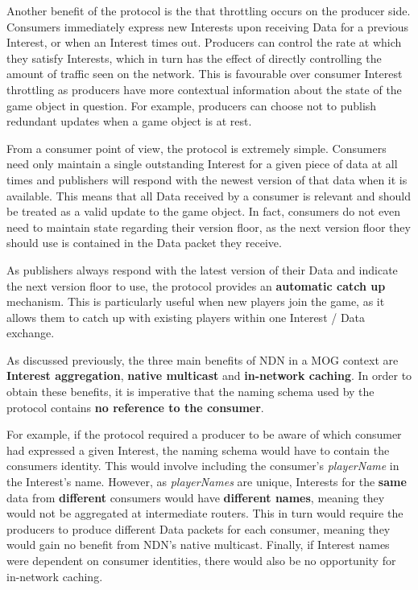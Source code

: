 Another benefit of the protocol is the that throttling occurs on the producer side. Consumers immediately express new Interests upon receiving Data for a previous Interest, or when an Interest times out. Producers can control the rate at which they satisfy Interests, which in turn has the effect of directly controlling the amount of traffic seen on the network. This is favourable over consumer Interest throttling as producers have more contextual information about the state of the game object in question. For example, producers can choose not to publish redundant updates when a game object is at rest.

From a consumer point of view, the protocol is extremely simple. Consumers need only maintain a single outstanding Interest for a given piece of data at all times and publishers will respond with the newest version of that data when it is available. This means that all Data received by a consumer is relevant and should be treated as a valid update to the game object. In fact, consumers do not even need to maintain state regarding their version floor, as the next version floor they should use is contained in the Data packet they receive.

As publishers always respond with the latest version of their Data and indicate the next version floor to use, the protocol provides an \textbf{automatic catch up} mechanism. This is particularly useful when new players join the game, as it allows them to catch up with existing players within one Interest / Data exchange.

As discussed previously, the three main benefits of NDN in a MOG context are \textbf{Interest aggregation}, \textbf{native multicast} and \textbf{in-network caching}. In order to obtain these benefits, it is imperative that the naming schema used by the protocol contains \textbf{no reference to the consumer}.

For example, if the protocol required a producer to be aware of which consumer had expressed a given Interest, the naming schema would have to contain the consumers identity. This would involve including the consumer's \textit{playerName} in the Interest's name. However, as \textit{playerNames} are unique, Interests for the \textbf{same} data from \textbf{different} consumers would have \textbf{different names}, meaning they would not be aggregated at intermediate routers. This in turn would require the producers to produce different Data packets for each consumer, meaning they would gain no benefit from NDN's native multicast. Finally, if Interest names were dependent on consumer identities, there would also be no opportunity for in-network caching.

